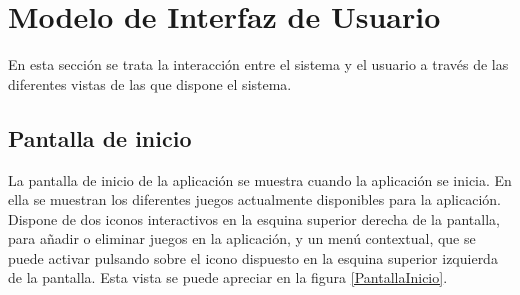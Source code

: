 
\section{Modelo de Interfaz de Usuario}
En esta sección se trata la interacción entre el sistema y el usuario a través de las diferentes vistas 
de las que dispone el sistema.

\subsection{Pantalla de inicio}
La pantalla de inicio de la aplicación se muestra cuando la aplicación se inicia. En ella se 
muestran los diferentes juegos actualmente disponibles para la aplicación.
Dispone de dos iconos interactivos en la esquina superior derecha de la pantalla, para añadir o eliminar 
juegos en la aplicación, y un menú contextual, que se puede activar pulsando sobre el icono dispuesto 
en la esquina superior izquierda de la pantalla. Esta vista se puede apreciar en la figura \ref*{PantallaInicio}.
\newpage

